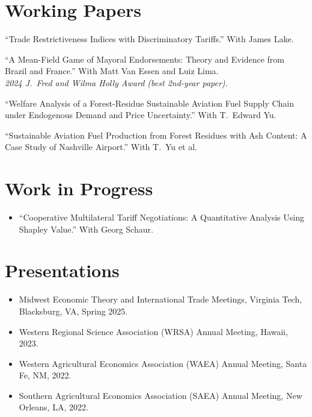 \documentclass[11pt]{article}
\begin{document}
\section*{Working Papers}

\begin{enumerate}[leftmargin=2em, label={[\arabic*]}]
  \item ``Trade Restrictiveness Indices with Discriminatory Tariffs.'' With James Lake.
  \item ``A Mean-Field Game of Mayoral Endorsements: Theory and Evidence from Brazil and France.'' With Matt Van Essen and Luiz Lima.\\
  \textit{2024 J.~Fred and Wilma Holly Award (best 2nd-year paper).}
  \item ``Welfare Analysis of a Forest-Residue Sustainable Aviation Fuel Supply Chain under Endogenous Demand and Price Uncertainty.'' With T.~Edward Yu.
  \item ``Sustainable Aviation Fuel Production from Forest Residues with Ash Content: A Case Study of Nashville Airport.'' With T.~Yu et al.
\end{enumerate}

\section*{Work in Progress}

\begin{itemize}
  \item ``Cooperative Multilateral Tariff Negotiations: A Quantitative Analysis Using Shapley Value.'' With Georg Schaur.
\end{itemize}

\section*{Presentations}

\begin{itemize}
  \item Midwest Economic Theory and International Trade Meetings, Virginia Tech, Blacksburg, VA, Spring 2025.
  \item Western Regional Science Association (WRSA) Annual Meeting, Hawaii, 2023.
  \item Western Agricultural Economics Association (WAEA) Annual Meeting, Santa Fe, NM, 2022.
  \item Southern Agricultural Economics Association (SAEA) Annual Meeting, New Orleans, LA, 2022.
\end{itemize}
\end{document}
